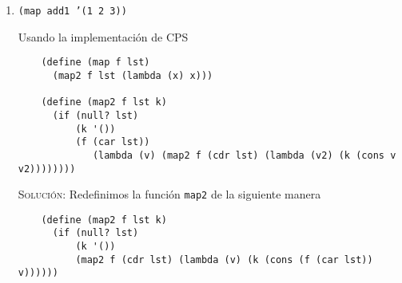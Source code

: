 \documentclass[letterpaper,11pt]{article}
\begin{document}
\begin{enumerate}
\begin{align*}
        \texttt{\textcolor{blue}{(cons \textcolor{red}{4} v))) (cons \textcolor{red}{3} v))) (cons \textcolor{red}{2} v))) (cons \textcolor{red}{1} v)))} \textcolor{green}{'()})} \\ 
        &= \texttt{(\textcolor{blue}{($\lambda$(v) (($\lambda$(v) (($\lambda$(v) (($\lambda$(v) (($\lambda$(x) x) (cons \textcolor{red}{5} v))) (cons \textcolor{red}{4} v))) }} \\ 
        &\; \; \; \; \; 
        \texttt{\textcolor{blue}{(cons \textcolor{red}{3} v))) (cons \textcolor{red}{2} v)))} \textcolor{green}{'(1)})} \\ 
        &= \texttt{(\textcolor{blue}{($\lambda$(v) (($\lambda$(v) (($\lambda$(v) (($\lambda$(x) x) (cons \textcolor{red}{5} v))) (cons \textcolor{red}{4} v))) (cons \textcolor{red}{3} v)))}} \\
        &\; \; \; \; \; 
        \texttt{\textcolor{green}{'(2 1)})} \\ 
        &= \texttt{(\textcolor{blue}{($\lambda$(v) (($\lambda$(v) (($\lambda$(x) x) (cons \textcolor{red}{5} v))) (cons \textcolor{red}{4} v)))} \textcolor{green}{'(3 2 1)})} \\
        &= \texttt{(\textcolor{blue}{($\lambda$(v) (($\lambda$(x) x) (cons \textcolor{red}{5} v))) } \textcolor{green}{'(4 3 2 1)})} \\
        &= \texttt{(\textcolor{blue}{($\lambda$(x) x)} \textcolor{green}{'(5 4 3 2 1)})} \\
        &= \texttt{\textcolor{green}{'(5 4 3 2 1)}}
    \end{align*}

    \item \texttt{(map add1 '(1 2 3))}

    Usando la implementación de CPS
    \begin{verbatim}
    (define (map f lst)
      (map2 f lst (lambda (x) x)))

    (define (map2 f lst k)
      (if (null? lst)
          (k '())
          (f (car lst))
             (lambda (v) (map2 f (cdr lst) (lambda (v2) (k (cons v v2))))))))
    \end{verbatim}

    \textsc{Solución:} Redefinimos la función \texttt{map2} de la siguiente manera
    \begin{verbatim}
    (define (map2 f lst k)
      (if (null? lst)
          (k '())
          (map2 f (cdr lst) (lambda (v) (k (cons (f (car lst)) v))))))
    \end{verbatim}


\end{enumerate}
\end{document}
